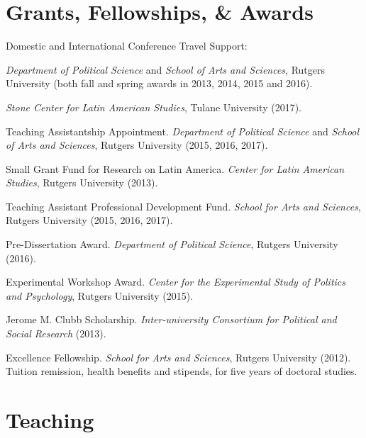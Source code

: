 \documentclass[letterpaper]{article}
\renewenvironment{itemize}{
  \begin{list}{}{
    \setlength{\leftmargin}{1.5em}
  }
}{
  \end{list}
}
\begin{document}
\section*{Grants, Fellowships, \& Awards}

\begin{itemize}
\item Domestic and International Conference Travel Support: 
\begin{itemize}
	\item \emph{Department of Political Science} and \emph{School of Arts and Sciences}, Rutgers University (both fall and spring awards in 2013, 2014, 2015 and 2016).
	\item \emph{Stone Center for Latin American Studies}, Tulane University (2017).
\end{itemize}
\item Teaching Assistantship Appointment. \emph{Department of Political Science} and \emph{School of Arts and Sciences}, Rutgers University (2015, 2016, 2017).
\item Small Grant Fund for Research on Latin America. \emph{Center for Latin American Studies}, Rutgers University (2013).
\item Teaching Assistant Professional Development Fund. \emph{School for Arts and Sciences}, Rutgers University (2015, 2016, 2017).
\item Pre-Dissertation Award. \emph{Department of Political Science}, Rutgers University (2016).
\item Experimental Workshop Award. \emph{Center for the Experimental Study of Politics and Psychology}, Rutgers University (2015).
\item Jerome M. Clubb Scholarship. \emph{Inter-university Consortium for Political and Social Research} (2013).
\item Excellence Fellowship. \emph{School for Arts and Sciences}, Rutgers University (2012). Tuition remission, health benefits and stipends, for five years of doctoral studies.
\end{itemize}


\section*{Teaching}
\end{document}
